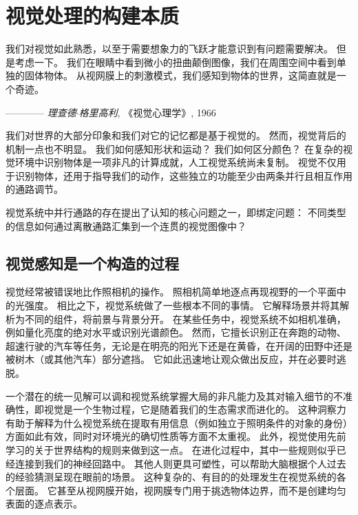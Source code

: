 \chapter{视觉处理的构建本质} \label{chap:chap21}

我们对视觉如此熟悉，以至于需要想象力的飞跃才能意识到有问题需要解决。
但是考虑一下。
我们在眼睛中看到微小的扭曲颠倒图像，我们在周围空间中看到单独的固体物体。
从视网膜上的刺激模式，我们感知到物体的世界，这简直就是一个奇迹。

\begin{flushright}
	———— \textit{理查德$\cdot$格里高利}, 《视觉心理学》, 1966 \hfill
\end{flushright}



我们对世界的大部分印象和我们对它的记忆都是基于视觉的。
然而，视觉背后的机制一点也不明显。
我们如何感知形状和运动？
我们如何区分颜色？
在复杂的视觉环境中识别物体是一项非凡的计算成就，人工视觉系统尚未复制。
视觉不仅用于识别物体，还用于指导我们的动作，这些独立的功能至少由两条并行且相互作用的通路调节。


视觉系统中并行通路的存在提出了认知的核心问题之一，即绑定问题：
不同类型的信息如何通过离散通路汇集到一个连贯的视觉图像中？



\section{视觉感知是一个构造的过程}

视觉经常被错误地比作照相机的操作。
照相机简单地逐点再现视野的一个平面中的光强度。
相比之下，视觉系统做了一些根本不同的事情。
它解释场景并将其解析为不同的组件，将前景与背景分开。
在某些任务中，视觉系统不如相机准确，例如量化亮度的绝对水平或识别光谱颜色。
然而，它擅长识别正在奔跑的动物、超速行驶的汽车等任务，无论是在明亮的阳光下还是在黄昏，在开阔的田野中还是被树木（或其他汽车）部分遮挡。
它如此迅速地让观众做出反应，并在必要时逃脱。


一个潜在的统一见解可以调和视觉系统掌握大局的非凡能力及其对输入细节的不准确性，即视觉是一个生物过程，它是随着我们的生态需求而进化的。
这种洞察力有助于解释为什么视觉系统在提取有用信息（例如独立于照明条件的对象的身份）方面如此有效，同时对环境光的确切性质等方面不太重视。
此外，视觉使用先前学习的关于世界结构的规则来做到这一点。
在进化过程中，其中一些规则似乎已经连接到我们的神经回路中。
其他人则更具可塑性，可以帮助大脑根据个人过去的经验猜测呈现在眼前的场景。
这种复杂的、有目的的处理发生在视觉系统的各个层面。 
它甚至从视网膜开始，视网膜专门用于挑选物体边界，而不是创建均匀表面的逐点表示。


